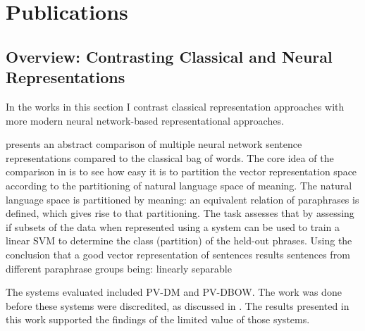 \documentclass{book}
\begin{document}
\part{Publications}

\chapter{Overview: Contrasting Classical and Neural Representations}
In the works in this section I contrast classical representation approaches with more modern neural network-based representational approaches.

 presents an abstract comparison of multiple neural network sentence representations compared to the classical bag of words.
The core idea of the comparison in  is to see how easy it is to partition the vector representation space according to the partitioning of natural language space of meaning.
The natural language space is partitioned by meaning: an equivalent relation of paraphrases is defined, which gives rise to that partitioning.
The task assesses that by assessing if subsets of the data when represented using a system can be used to train a linear SVM to determine the class (partition) of the held-out phrases.
Using the conclusion that a good vector representation of sentences results sentences from different paraphrase groups being:
linearly separable



The systems evaluated included PV-DM and PV-DBOW.
The work was done before these systems were discredited, 
as discussed in .
The results presented in this work supported the findings of the limited value of those systems.













\end{document}
